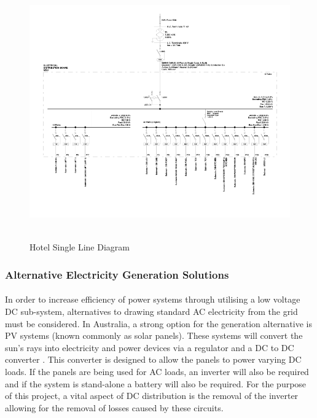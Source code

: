 \begin{figure}[H]
\hfill\includegraphics[width = 160mm, height = 110mm]{images/PCad_SLD}\hspace*{\fill}
\caption{{Hotel Single Line Diagram}}
\label{fig:SLD}
\end{figure}       

\subsubsection{Alternative Electricity Generation Solutions}

\paragraph{}
In order to increase efficiency of power systems through utilising a low voltage DC sub-system, alternatives to drawing standard AC electricity from the grid must be considered. In Australia, a strong option for the generation alternative is PV systems (known commonly as solar panels). These systems will convert the sun’s rays into electricity and power devices via a regulator and a DC to DC converter \cite{Pillay2004}. This converter is designed to allow the panels to power varying DC loads. If the panels are being used for AC loads, an inverter will also be required and if the system is stand-alone a battery will also be required. For the purpose of this project, a vital aspect of DC distribution is the removal of the inverter allowing for the removal of losses caused by these circuits.   

